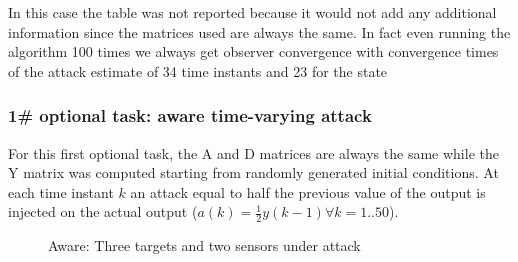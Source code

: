     \noindent
    In this case the table was not reported because it would not add any additional information since the matrices used are always the same. In fact even running the algorithm 100 times we always get observer convergence with convergence times of the attack estimate of 34 time instants and 23 for the state

    
    \newpage
    \subsubsection*{1\# optional task: aware time-varying attack}
    For this first optional task, the A and D matrices are always the same while the Y matrix was computed starting from randomly generated initial conditions. At each time instant $k$ an attack equal to half the previous value of the output is injected on the actual output ($a(k)= \frac{1}{2}y(k-1) \forall k=1..50$). 
    \begin{figure}[h]   
        \vspace{-1cm}
        \centering 
        \caption{Aware: Three targets and two sensors under attack}
        \label{fig:aware_2}
    \end{figure}
    
